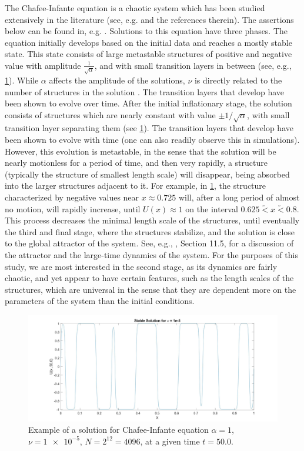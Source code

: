 \documentclass[12pt]{amsart}
\theoremstyle{plain}
\theoremstyle{definition}
\theoremstyle{remark}
\numberwithin{equation}{section} %
\numberwithin{figure}{section}   %
\begin{document}
The Chafee-Infante equation is a chaotic system which has been studied extensively in the literature (see, e.g. \cite{Cohen_2000,Ward_1996,Shen_2010,Grant_1995} and the references therein). The assertions below can be found in, e.g. \cite{Ward_1996,deMottoni_1990,Chen_1992}. Solutions to this equation have three phases. The equation initially develops based on the initial data and reaches a mostly stable state. This state consists of large metastable structures of positive and negative value with amplitude $\frac{1}{\sqrt{\alpha}}$, and with small transition layers in between (see, e.g., \cref{fig:example}).  While $\alpha$ affects the amplitude of the solutions, $\nu$ is directly related to the number of structures in the solution \cite{Robinson_2001}. The transition layers that develop have been shown to evolve over time. After the initial inflationary stage, the solution consists of structures which are nearly constant with value $\pm 1/\sqrt{\alpha}$, with small transition layer separating them (see \cref{fig:example}).  The transition layers that develop have been shown to evolve with time (one can also readily observe this in simulations).  However, this evolution is metastable, in the sense that the solution will be nearly motionless for a period of time, and then very rapidly, a structure (typically the structure of smallest length scale) will disappear, being absorbed into the larger structures adjacent to it.  For example, in \cref{fig:example}, the structure characterized by negative values near $x\approx 0.725$ will, after a long period of almost no motion, will rapidly increase, until $U(x)\approx 1$ on the interval $0.625\utilde{<}x\utilde{<}0.8$.  This process decreases the minimal length scale of the structures, until eventually the third and final stage, where the structures stabilize, and the solution is close to the global attractor of the system.  See, e.g., \cite{Robinson_2001}, Section 11.5, for a discussion of the attractor and the large-time dynamics of the system.  For the purposes of this study, we are most interested in the second stage, as its dynamics are fairly chaotic, and yet appear to have certain features, such as the length scales of the structures, which are universal in the sense that they are dependent more on the parameters of the system than the initial conditions.


\begin{figure}
	\centering
	\includegraphics[scale=0.15]{Example.jpg}
	\caption{Example of a solution for Chafee-Infante equation $\alpha = 1$, $\nu=\num{1e-5}$,  $N = 2^{12}=4096$, at a given time $t=50.0$.}
	\label{fig:example}
\end{figure}
\end{document}
